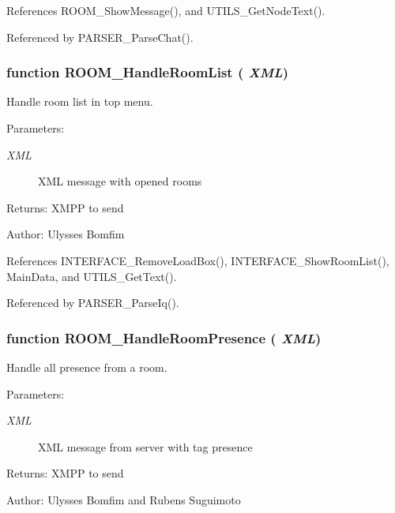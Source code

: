 References ROOM\_\-ShowMessage(), and UTILS\_\-GetNodeText().

Referenced by PARSER\_\-ParseChat().
\subsubsection[ROOM\_\-HandleRoomList]{\setlength{\rightskip}{0pt plus 5cm}function ROOM\_\-HandleRoomList ( {\em XML})}\label{room_2room_8js_e60c68aa283c093e99208aa162fbadf4}


Handle room list in top menu. 

\begin{Desc}
\item[Parameters:]
\begin{description}
\item[{\em XML}]XML message with opened rooms \end{description}
\end{Desc}
\begin{Desc}
\item[Returns:]XMPP to send \end{Desc}
\begin{Desc}
\item[Author:]Ulysses Bomfim \end{Desc}


References INTERFACE\_\-RemoveLoadBox(), INTERFACE\_\-ShowRoomList(), MainData, and UTILS\_\-GetText().

Referenced by PARSER\_\-ParseIq().
\subsubsection[ROOM\_\-HandleRoomPresence]{\setlength{\rightskip}{0pt plus 5cm}function ROOM\_\-HandleRoomPresence ( {\em XML})}\label{room_2room_8js_52799481e66372e148ff1ee3bac60618}


Handle all presence from a room. 

\begin{Desc}
\item[Parameters:]
\begin{description}
\item[{\em XML}]XML message from server with tag presence \end{description}
\end{Desc}
\begin{Desc}
\item[Returns:]XMPP to send \end{Desc}
\begin{Desc}
\item[Author:]Ulysses Bomfim and Rubens Suguimoto \end{Desc}


